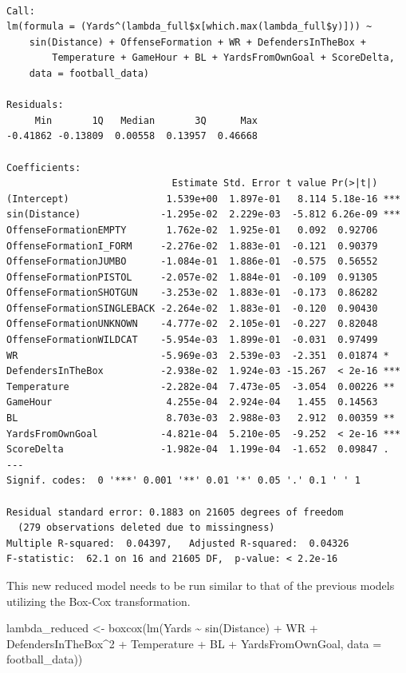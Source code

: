 \documentclass[
  super,
  preprint,
  3p]{elsarticle}
\newenvironment{Shaded}{\begin{snugshade}}{\end{snugshade}}
\newcommand{\AttributeTok}[1]{\textcolor[rgb]{0.40,0.45,0.13}{#1}}
\newcommand{\DecValTok}[1]{\textcolor[rgb]{0.68,0.00,0.00}{#1}}
\newcommand{\FunctionTok}[1]{\textcolor[rgb]{0.28,0.35,0.67}{#1}}
\newcommand{\NormalTok}[1]{\textcolor[rgb]{0.00,0.23,0.31}{#1}}
\newcommand{\OtherTok}[1]{\textcolor[rgb]{0.00,0.23,0.31}{#1}}
\newcommand{\SpecialCharTok}[1]{\textcolor[rgb]{0.37,0.37,0.37}{#1}}
\begin{document}
\begin{verbatim}

Call:
lm(formula = (Yards^(lambda_full$x[which.max(lambda_full$y)])) ~ 
    sin(Distance) + OffenseFormation + WR + DefendersInTheBox + 
        Temperature + GameHour + BL + YardsFromOwnGoal + ScoreDelta, 
    data = football_data)

Residuals:
     Min       1Q   Median       3Q      Max 
-0.41862 -0.13809  0.00558  0.13957  0.46668 

Coefficients:
                             Estimate Std. Error t value Pr(>|t|)    
(Intercept)                 1.539e+00  1.897e-01   8.114 5.18e-16 ***
sin(Distance)              -1.295e-02  2.229e-03  -5.812 6.26e-09 ***
OffenseFormationEMPTY       1.762e-02  1.925e-01   0.092  0.92706    
OffenseFormationI_FORM     -2.276e-02  1.883e-01  -0.121  0.90379    
OffenseFormationJUMBO      -1.084e-01  1.886e-01  -0.575  0.56552    
OffenseFormationPISTOL     -2.057e-02  1.884e-01  -0.109  0.91305    
OffenseFormationSHOTGUN    -3.253e-02  1.883e-01  -0.173  0.86282    
OffenseFormationSINGLEBACK -2.264e-02  1.883e-01  -0.120  0.90430    
OffenseFormationUNKNOWN    -4.777e-02  2.105e-01  -0.227  0.82048    
OffenseFormationWILDCAT    -5.954e-03  1.899e-01  -0.031  0.97499    
WR                         -5.969e-03  2.539e-03  -2.351  0.01874 *  
DefendersInTheBox          -2.938e-02  1.924e-03 -15.267  < 2e-16 ***
Temperature                -2.282e-04  7.473e-05  -3.054  0.00226 ** 
GameHour                    4.255e-04  2.924e-04   1.455  0.14563    
BL                          8.703e-03  2.988e-03   2.912  0.00359 ** 
YardsFromOwnGoal           -4.821e-04  5.210e-05  -9.252  < 2e-16 ***
ScoreDelta                 -1.982e-04  1.199e-04  -1.652  0.09847 .  
---
Signif. codes:  0 '***' 0.001 '**' 0.01 '*' 0.05 '.' 0.1 ' ' 1

Residual standard error: 0.1883 on 21605 degrees of freedom
  (279 observations deleted due to missingness)
Multiple R-squared:  0.04397,   Adjusted R-squared:  0.04326 
F-statistic:  62.1 on 16 and 21605 DF,  p-value: < 2.2e-16
\end{verbatim}

This new reduced model needs to be run similar to that of the previous
models utilizing the Box-Cox transformation.

\begin{Shaded}
\begin{Highlighting}[]
\NormalTok{lambda\_reduced }\OtherTok{\textless{}{-}} \FunctionTok{boxcox}\NormalTok{(}\FunctionTok{lm}\NormalTok{(Yards }\SpecialCharTok{\textasciitilde{}} \FunctionTok{sin}\NormalTok{(Distance) }\SpecialCharTok{+}\NormalTok{ WR }\SpecialCharTok{+}\NormalTok{ DefendersInTheBox}\SpecialCharTok{\^{}}\DecValTok{2} \SpecialCharTok{+}\NormalTok{ Temperature }\SpecialCharTok{+}\NormalTok{ BL }\SpecialCharTok{+}\NormalTok{ YardsFromOwnGoal, }\AttributeTok{data =}\NormalTok{ football\_data))}
\end{Highlighting}
\end{Shaded}
\end{document}
